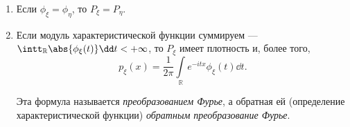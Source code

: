  \begin{corollary}
\enewline
     \begin{enumerate}
         \item Если $\phi_\xi = \phi_\eta$, то $P_\xi = P_\eta$.

         \item Если модуль характеристической функции суммируем ---  $\intt_\mathbb{R}\abs{\phi_\xi(t)}\dd t < + \infty$, то $P_\xi$ имеет плотность и, более того, 
         $$p_\xi(x) = \frac{1}{2\pi} \int\limits_\mathbb{R}e^{-itx}\phi_\xi(t)\dd t.$$

        Эта формула называется \textit{преобразованием Фурье}, а обратная ей (определение характеристической функции) \textit{обратным преобразование Фурье}.
     \end{enumerate}
 \end{corollary}
